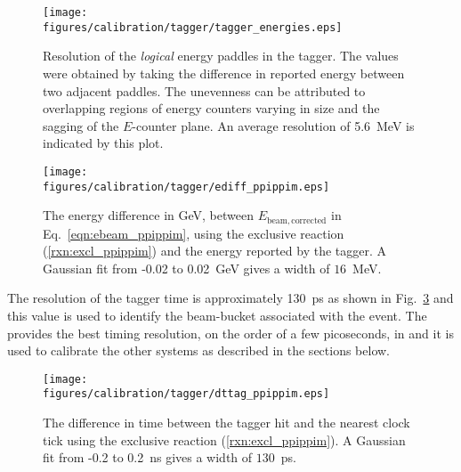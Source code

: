 \begin{figure}\begin{center}
\texttt{[image: \\figures/calibration/tagger/tagger\_energies.eps]}
\caption[ Energy Resolution vs.\ Beam Energy]{\label{fig:data.calib.tag_energy}Resolution of the \emph{logical} energy paddles in the tagger. The values were obtained by taking the difference in reported energy between two adjacent paddles. The unevenness can be attributed to overlapping regions of energy counters varying in size and the sagging of the $E$-counter plane\cite{clas.thesis.williams}. An average resolution of 5.6~MeV is indicated by this plot.}
\end{center}\end{figure}

\begin{figure}\begin{center}
\texttt{[image: \\figures/calibration/tagger/ediff\_ppippim.eps]}
\caption[ Energy Resolution, Overall]{\label{fig:data.calib.ediff_ppippim}The energy difference in GeV, between $E_\mathrm{beam, corrected}$ in Eq.~\ref{eqn:ebeam_ppippim}, using the exclusive reaction (\ref{rxn:excl_ppippim}) and the energy reported by the tagger. A Gaussian fit from -0.02 to 0.02~GeV gives a width of $16$~MeV.}
\end{center}\end{figure}

The resolution of the tagger time is approximately 130~ps as shown in Fig.~\ref{fig:data.calib.dttag_ppippim} and this value is used to identify the  beam-bucket associated with the event. The  provides the best timing resolution, on the order of a few picoseconds, in  and it is used to calibrate the other systems as described in the sections below.

\begin{figure}\begin{center}
\texttt{[image: \\figures/calibration/tagger/dttag\_ppippim.eps]}
\caption[ Timing Resolution]{\label{fig:data.calib.dttag_ppippim}The difference in time between the tagger hit and the nearest  clock tick using the exclusive reaction (\ref{rxn:excl_ppippim}). A Gaussian fit from -0.2 to 0.2~ns gives a width of $130$~ps.}
\end{center}\end{figure}

